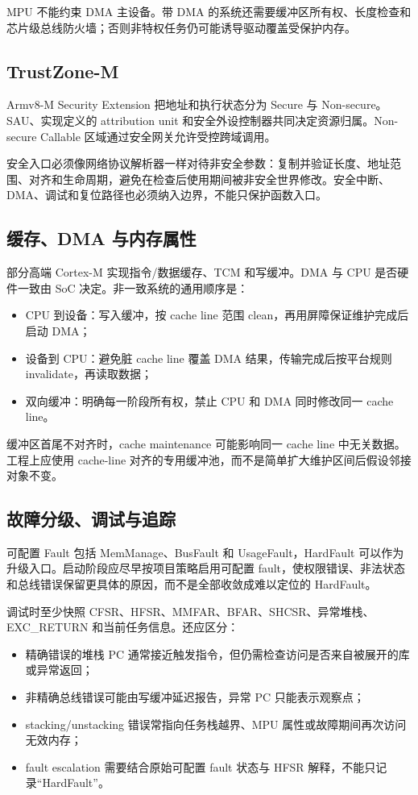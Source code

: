 MPU 不能约束 DMA 主设备。带 DMA 的系统还需要缓冲区所有权、长度检查和芯片级总线防火墙；否则非特权任务仍可能诱导驱动覆盖受保护内存。

\subsection{TrustZone-M}

Armv8-M Security Extension 把地址和执行状态分为 Secure 与 Non-secure。SAU、实现定义的 attribution unit 和安全外设控制器共同决定资源归属。Non-secure Callable 区域通过安全网关允许受控跨域调用。

安全入口必须像网络协议解析器一样对待非安全参数：复制并验证长度、地址范围、对齐和生命周期，避免在检查后使用期间被非安全世界修改。安全中断、DMA、调试和复位路径也必须纳入边界，不能只保护函数入口。

\subsection{缓存、DMA 与内存属性}

部分高端 Cortex-M 实现指令/数据缓存、TCM 和写缓冲。DMA 与 CPU 是否硬件一致由 SoC 决定。非一致系统的通用顺序是：
\begin{itemize}
  \item CPU 到设备：写入缓冲，按 cache line 范围 clean，再用屏障保证维护完成后启动 DMA；
  \item 设备到 CPU：避免脏 cache line 覆盖 DMA 结果，传输完成后按平台规则 invalidate，再读取数据；
  \item 双向缓冲：明确每一阶段所有权，禁止 CPU 和 DMA 同时修改同一 cache line。
\end{itemize}

缓冲区首尾不对齐时，cache maintenance 可能影响同一 cache line 中无关数据。工程上应使用 cache-line 对齐的专用缓冲池，而不是简单扩大维护区间后假设邻接对象不变。

\subsection{故障分级、调试与追踪}

可配置 Fault 包括 MemManage、BusFault 和 UsageFault，HardFault 可以作为升级入口。启动阶段应尽早按项目策略启用可配置 fault，使权限错误、非法状态和总线错误保留更具体的原因，而不是全部收敛成难以定位的 HardFault。

调试时至少快照 CFSR、HFSR、MMFAR、BFAR、SHCSR、异常堆栈、EXC\_RETURN 和当前任务信息。还应区分：
\begin{itemize}
  \item 精确错误的堆栈 PC 通常接近触发指令，但仍需检查访问是否来自被展开的库或异常返回；
  \item 非精确总线错误可能由写缓冲延迟报告，异常 PC 只能表示观察点；
  \item stacking/unstacking 错误常指向任务栈越界、MPU 属性或故障期间再次访问无效内存；
  \item fault escalation 需要结合原始可配置 fault 状态与 HFSR 解释，不能只记录“HardFault”。
\end{itemize}

